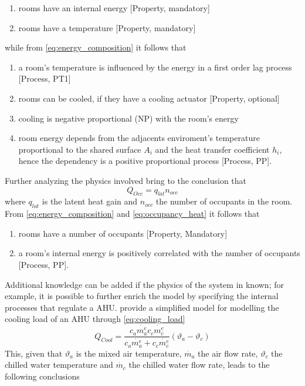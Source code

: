 \begin{enumerate}[noitemsep]
  \item rooms have an internal energy [Property, mandatory]
  \item rooms have a temperature [Property, mandatory]
\end{enumerate}
while from \autoref{eq:energy_composition} it follows that
\begin{enumerate}
  \item a room's temperature is influenced by the energy in a first order lag process [Process, PT1]
  \item rooms can be cooled, if they have a cooling actuator [Property, optional]
  \item cooling is negative proportional (NP) with the room's energy
  \item room energy depends from the adjacents enviroment's temperature proportional to the shared surface $A_i$ and the heat transfer coefficient $h_i$, hence the dependency is a positive proportional process [Process, PP].
\end{enumerate}
Further analyzing the physics involved bring to the conclusion that
\begin{equation}
  Q_{Occ}=q_{lat}n_{occ} \label{eq:occupancy_heat}
\end{equation}
where $q_{lat}$ is the latent heat gain and $n_{occ}$ the number of occupants in the room. From  \autoref{eq:energy_composition} and \autoref{eq:occupancy_heat} it follows that
\begin{enumerate}
  \item rooms have a number of occupants [Property, Mandatory]
  \item a room's internal energy is positively correlated with the number of occupants [Process, PP].
\end{enumerate}
Additional knowledge can be added if the physics of the system in known; for example, it is possible to further enrich the model by specifying the internal processes that regulate a AHU. \textcite{building_ahu_physics} provide a simplified model for modelling the cooling load of an AHU through \autoref{eq:cooling_load}
\begin{equation}
  Q_{Cool}=\frac{c_a\dot{m_{a}^{e}}c_c\dot{m_{c}^{e}}}{c_{a}\dot{m_{a}^{e}}+c_c\dot{m_{c}^{e}}}(\vartheta_{a}-\vartheta_{c}) \label{eq:cooling_load}
\end{equation}
This, given that $\vartheta_a$ is the mixed air temperature, $\dot{m_a}$ the air flow rate, $\vartheta_c$ the chilled water temperature and $\dot{m_c}$ the chilled water flow rate, leads to the following conclusions
